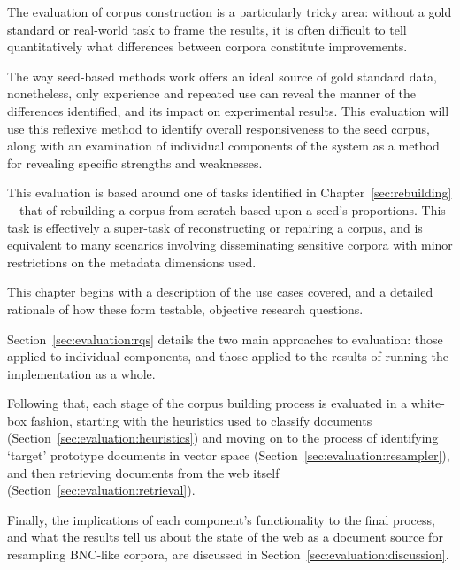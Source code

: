 
The evaluation of corpus construction is a particularly tricky area: without a gold standard or real-world task to frame the results, it is often difficult to tell quantitatively what differences between corpora constitute improvements.


The way seed-based methods work offers an ideal source of gold standard data, nonetheless, only experience and repeated use can reveal the manner of the differences identified, and its impact on experimental results.  This evaluation will use this reflexive method to identify overall responsiveness to the seed corpus, along with an examination of individual components of the system as a method for revealing specific strengths and weaknesses.

This evaluation is based around one of tasks identified in Chapter~\ref{sec:rebuilding}---that of rebuilding a corpus from scratch based upon a seed's proportions.  This task is effectively a super-task of reconstructing or repairing a corpus, and is equivalent to many scenarios involving disseminating sensitive corpora with minor restrictions on the metadata dimensions used.



This chapter begins with a description of the use cases covered, and a detailed rationale of how these form testable, objective research questions.

Section~\ref{sec:evaluation:rqs} details the two main approaches to evaluation: those applied to individual components, and those applied to the results of running the implementation as a whole.

Following that, each stage of the corpus building process is evaluated in a white-box fashion, starting with the heuristics used to classify documents (Section~\ref{sec:evaluation:heuristics}) and moving on to the process of identifying `target' prototype documents in vector space (Section~\ref{sec:evaluation:resampler}), and then retrieving documents from the web itself (Section~\ref{sec:evaluation:retrieval}).

Finally, the implications of each component's functionality to the final process, and what the results tell us about the state of the web as a document source for resampling BNC-like corpora, are discussed in Section~\ref{sec:evaluation:discussion}.




